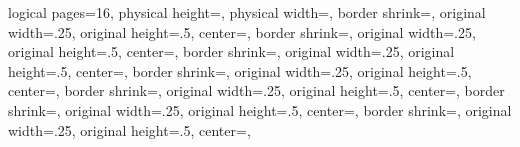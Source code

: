 %
%
%
%
%
%
%

{%
	\edef\pgfpageoptionheight{\the\paperheight}%
	\edef\pgfpageoptionwidth{\the\paperwidth}%
	\edef\pgfpageoptionborder{1pt}%
}%
{
  \pgfpagesphysicalpageoptions%
  {%
    logical pages=16,%
    physical height=\pgfpageoptionheight,%
    physical width=\pgfpageoptionwidth,%
  }%
%
%
  {%
    border shrink=\pgfpageoptionborder,%
    original width=.25\pgfpageoptionheight,%
    original height=.5\pgfpageoptionwidth,%
	center=\pgfpoint{0pt}{\pgfphysicalheight},%
  }%
  {%
    border shrink=\pgfpageoptionborder,%
    original width=.25\pgfpageoptionheight,%
    original height=.5\pgfpageoptionwidth,%
	center=\pgfpoint{.5\pgfphysicalwidth}{\pgfphysicalheight},%
  }%
  {%
  	border shrink=\pgfpageoptionborder,%
  	original width=.25\pgfpageoptionheight,%
  	original height=.5\pgfpageoptionwidth,%
	center=\pgfpoint{0pt}{.75\pgfphysicalheight},%
  }%
  {%
  	border shrink=\pgfpageoptionborder,%
	original width=.25\pgfpageoptionheight,%
	original height=.5\pgfpageoptionwidth,%
	center=\pgfpoint{.5\pgfphysicalwidth}{.75\pgfphysicalheight},%
  }%
  {%
	border shrink=\pgfpageoptionborder,%
	original width=.25\pgfpageoptionheight,%
	original height=.5\pgfpageoptionwidth,%
	center=\pgfpoint{0pt}{.5\pgfphysicalheight},%
  }%
  {%
	border shrink=\pgfpageoptionborder,%
	original width=.25\pgfpageoptionheight,%
	original height=.5\pgfpageoptionwidth,%
	center=\pgfpoint{.5\pgfphysicalwidth}{.5\pgfphysicalheight},%
  }%
  {%
	border shrink=\pgfpageoptionborder,%
	original width=.25\pgfpageoptionheight,%
	original height=.5\pgfpageoptionwidth,%
	center=\pgfpoint{0pt}{.25\pgfphysicalheight},%
  }%
}
